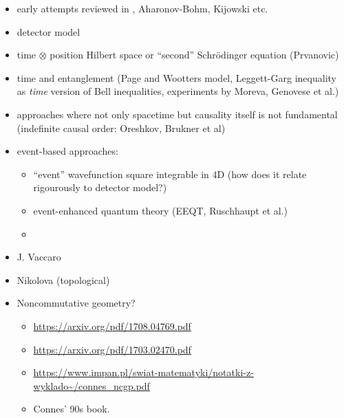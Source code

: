 \begin{itemize}
\item early attempts reviewed in \cite{TQM1, TQM2}, Aharonov-Bohm, Kijowski etc.
\item detector model \cite{TQM1, TQM2}
\item
    time $\otimes$ position Hilbert space or ``second'' Schr\"odinger equation (Prvanovic)
\item time and entanglement (Page and Wootters model, Leggett-Garg inequality as \emph{time} version of Bell inequalities, experiments by Moreva, Genovese et al.)
\item approaches where not only spacetime but causality itself is not fundamental (indefinite causal order: Oreshkov, Brukner et al)
\item event-based approaches: 
  \begin{itemize}
    \item ``event'' wavefunction square integrable in 4D (how does it relate rigourously to detector model?)
    \item event-enhanced quantum theory (EEQT, Ruschhaupt et al.)
    \item 
  \end{itemize}
\item J. Vaccaro
\item Nikolova (topological)
\item Noncommutative geometry?
\begin{itemize}
  \item \url{https://arxiv.org/pdf/1708.04769.pdf}
  \item \url{https://arxiv.org/pdf/1703.02470.pdf}
  \item \url{https://www.impan.pl/swiat-matematyki/notatki-z-wyklado~/connes_ncgp.pdf}
  \item Connes' 90s book.
\end{itemize}
\end{itemize}

